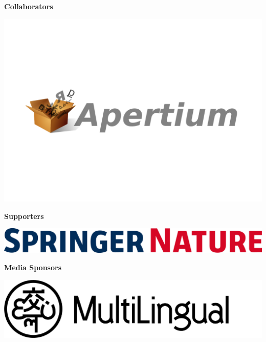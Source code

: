 \documentclass[11pt,oneside]{book}
\begin{document}
  \bigskip
  \bigskip
    \begin{samepage}
  \noindent
  {\Large \textbf{Collaborators}}

  \nopagebreak
            \begin{minipage}[c][0.21\linewidth][c]{0.21\linewidth}
        \includegraphics[width=\linewidth]{eamt_volume_1/sponsor_logos/apertium_open_box_line.svg.pdf}
      \end{minipage}\hspace{0.05\linewidth}
    
    \end{samepage}

  \bigskip
  \bigskip
    \begin{samepage}
  \noindent
  {\Large \textbf{Supporters}}

  \nopagebreak
            \begin{minipage}[c][0.21\linewidth][c]{0.21\linewidth}
        \includegraphics[width=\linewidth]{eamt_volume_1/sponsor_logos/SN_logo_RGB-2.jpg}
      \end{minipage}\hspace{0.05\linewidth}
    
    \end{samepage}

  \bigskip
  \bigskip
    \begin{samepage}
  \noindent
  {\Large \textbf{Media Sponsors}}

  \nopagebreak
            \begin{minipage}[c][0.21\linewidth][c]{0.21\linewidth}
        \includegraphics[width=\linewidth]{eamt_volume_1/sponsor_logos/Logotype_With_Mark.png}
      \end{minipage}\hspace{0.05\linewidth}
    
    \end{samepage}
\end{document}
